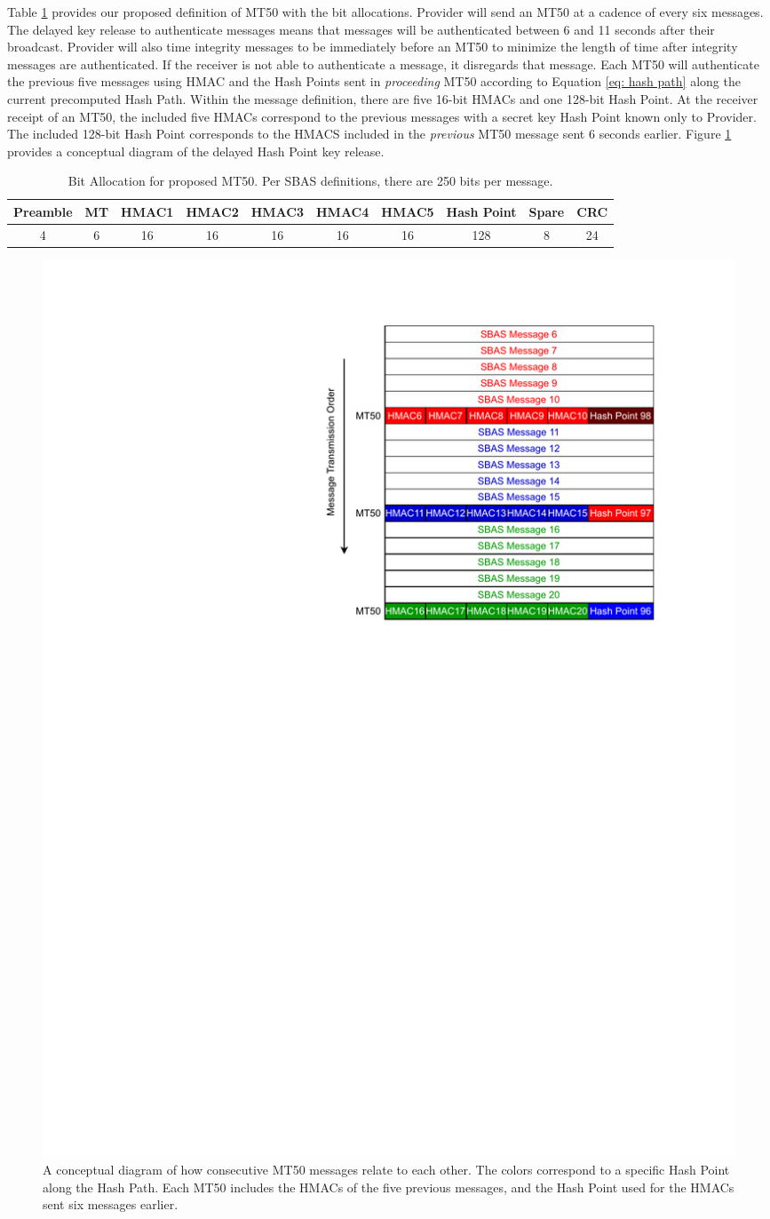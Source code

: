 \documentclass[letterpaper,times]{IONconf/IONconf}
\begin{document}
Table \ref{tab: littlemac} provides our proposed definition of MT50 with the bit allocations.
Provider will send an MT50 at a cadence of every six messages.
The delayed key release to authenticate messages means that messages will be authenticated between 6 and 11 seconds after their broadcast.
Provider will also time integrity messages to be immediately before an MT50 to minimize the length of time after integrity messages are authenticated.
If the receiver is not able to authenticate a message, it disregards that message.
Each MT50 will authenticate the previous five messages using HMAC and the Hash Points sent in {\em proceeding} MT50 according to Equation \eqref{eq: hash path} along the current precomputed Hash Path.
Within the message definition, there are five 16-bit HMACs and one 128-bit Hash Point.
At the receiver receipt of an MT50, the included five HMACs correspond to the previous messages with a secret key Hash Point known only to Provider.
The included 128-bit Hash Point corresponds to the HMACS included in the {\em previous} MT50 message sent 6 seconds earlier.
Figure \ref{fig: MT50 Schedule} provides a conceptual diagram of the delayed Hash Point key release.

\begin{table}[H]
\center
\begin{tabular}{|c|c|c|c|c|c|c|c|c|c|} \hline
	Preamble & MT & HMAC1 & HMAC2 & HMAC3 & HMAC4 & HMAC5 & Hash Point & Spare & CRC \\ \hline
	4 & 6 & 16 & 16 & 16 & 16 & 16 & 128 & 8 & 24 \\ \hline
\end{tabular}
\caption{Bit Allocation for proposed MT50. Per SBAS definitions, there are 250 bits per message.}
\label{tab: littlemac}
\end{table}{}

\begin{figure}
\centering
\includegraphics[width=0.5\linewidth]{fig/MT50Schedule.pdf}
\caption{A conceptual diagram of how consecutive MT50 messages relate to each other. The colors correspond to a specific Hash Point along the Hash Path. Each MT50 includes the HMACs of the five previous messages, and the Hash Point used for the HMACs sent six messages earlier.}
\label{fig: MT50 Schedule}
\end{figure}
\end{document}
